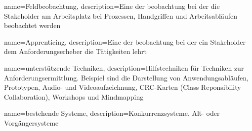  {
	name=Feldbeobachtung,
	description={Eine der \gls{beobachtung} bei der die Stakeholder am Arbeitsplatz bei Prozessen, Handgriffen und Arbeitsabl\"aufen beobachtet werden}}
	
 {
	name=Apprenticing,
	description={Eine der \gls{beobachtung} bei der ein Stakeholder dem Anforderungserheber die T\"atigkeiten lehrt}}
	
 {
	name=unterst\"utzende Techniken,
	description={Hilfstechniken f\"ur Techniken zur Anforderungsermittlung. Beispiel sind die Darstellung von Anwendungsabl\"aufen, Prototypen, Audio- und Videoaufzeichnung, CRC-Karten (Class Reponsibility Collaboration), Workshops und Mindmapping}}
	
 {
	name=bestehende Systeme,
	description={Konkurrenzsysteme, Alt- oder Vorg\"angersysteme}}